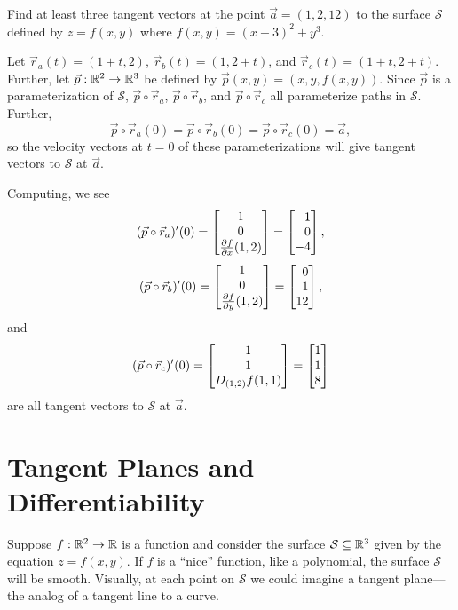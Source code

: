 \begin{example}
	Find at least three tangent vectors at the point $\vec a=(1,2,12)$
	to the surface $\mathcal S$ defined by $z=f(x,y)$ where $f(x,y)=(x-3)^2+y^3$.

	Let $\vec r_a(t) = (1+t,2)$, $\vec r_b(t)=(1,2+t)$, and $\vec r_c(t)=
	(1+t,2+t)$.  Further, let $\vec p:\mathbb{R}^2\to\mathbb{R}^3$ be defined by $\vec p(x,y)=
	(x,y,f(x,y))$.  Since $\vec p$ is a parameterization of $\mathcal S$,
	$\vec p\circ \vec r_a$, $\vec p\circ \vec r_b$, 
	and $\vec p\circ \vec r_c$ all parameterize paths in $\mathcal S$.  Further,
	\[\vec p\circ \vec r_a(0)=\vec p\circ \vec r_b(0)=\vec p\circ \vec r_c(0)=\vec a,\]
	so the velocity vectors at $t=0$ of these parameterizations will give 
	tangent vectors to $\mathcal S$ at $\vec a$.
	
	Computing, we see
	\[
	(\vec p\circ \vec r_a)'(0)
	= \matc{1\\0\\\frac{\partial f}{\partial x}(1,2)} = \mat{1\\0\\-4},
	\]
	\[
	(\vec p\circ \vec r_b)'(0)
	= \matc{1\\0\\\frac{\partial f}{\partial y}(1,2)} = \mat{0\\1\\12},
	\]
	and
	\[
	(\vec p\circ \vec r_c)'(0)
	= \matc{1\\1\\ D_{(1,2)}f(1,1)} = \mat{1\\1\\8}
	\]
	are all tangent vectors to $\mathcal S$ at $\vec a$.
\end{example}



\begin{exercises}
\end{exercises}

\section{Tangent Planes and Differentiability}

Suppose $f:\mathbb{R}^2\to\mathbb{R}$ is a function and consider the surface $\mathcal S\subseteq \mathbb{R}^3$
given by the equation $z=f(x,y)$.  If $f$ is a ``nice'' function, like a polynomial, 
the surface $\mathcal S$ will be smooth.  Visually, at each point on $\mathcal S$ we
could imagine a tangent plane---the analog of a tangent line to a curve.

